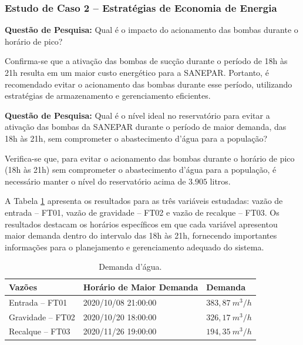 \subsubsection{Estudo de Caso 2 -- Estrat\'egias de Economia de Energia}

\textbf{Questão de Pesquisa:} Qual é o impacto do acionamento das bombas durante o horário de pico?

Confirma-se que a ativação das bombas de sucção durante o período de 18h às 21h resulta em um maior custo energético para a SANEPAR. Portanto, é recomendado evitar o acionamento das bombas durante esse período, utilizando estratégias de armazenamento e gerenciamento eficientes.

\textbf{Questão de Pesquisa:} Qual é o nível ideal no reservatório para evitar a ativação das bombas da SANEPAR durante o período de maior demanda, das 18h às 21h, sem comprometer o abastecimento d'água para a população?

Verifica-se que, para evitar o acionamento das bombas durante o horário de pico (18h às 21h) sem comprometer o abastecimento d'água para a população, é necessário manter o nível do reservatório acima de $3.905$ litros.


A Tabela \ref{tb:dem} apresenta os resultados para as três variáveis estudadas: vazão de entrada -- FT01, vazão de gravidade -- FT02 e vazão de recalque -- FT03. Os resultados destacam os horários específicos em que cada variável apresentou maior demanda dentro do intervalo das 18h às 21h, fornecendo importantes informações para o planejamento e gerenciamento adequado do sistema.



\begin{table}[!htb]
	\centering
	\caption{Demanda d'água.}\label{tb:dem}
	\begin{tabular}{@{}lll@{}}
		\toprule
		\textbf{Vazões}         & \textbf{Horário de Maior Demanda} & \textbf{Demanda} \\ \midrule
		Entrada -- FT01   & 2020/10/08 21:00:00               & $383,87 \ m^3/h$                   \\
		Gravidade -- FT02 & 2020/10/20 18:00:00               & $326,17 \ m^3/h$                    \\
		Recalque -- FT03  & 2020/11/26 19:00:00               & $194,35 \ m^3/h$                    \\ \bottomrule
	\end{tabular}
	
	
\end{table}

